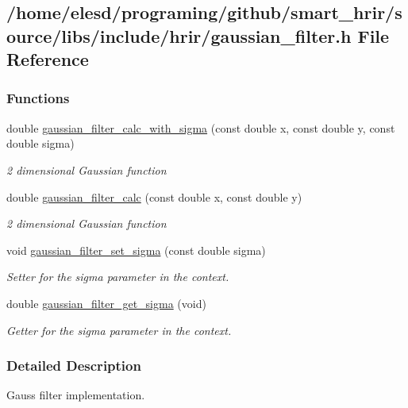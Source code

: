 \hypertarget{a00008}{\subsection{/home/elesd/programing/github/smart\-\_\-hrir/source/libs/include/hrir/gaussian\-\_\-filter.h File Reference}
\label{a00008}
}
\subsubsection*{Functions}
\begin{DoxyCompactItemize}
\item 
double \hyperlink{a00008_a316f61d728c11dcb3990199530349adb}{gaussian\-\_\-filter\-\_\-calc\-\_\-with\-\_\-sigma} (const double x, const double y, const double sigma)
\begin{DoxyCompactList}\small\item\em 2 dimensional Gaussian function \end{DoxyCompactList}\item 
double \hyperlink{a00008_ada1fef0f18b43799dcc82232bf786ad5}{gaussian\-\_\-filter\-\_\-calc} (const double x, const double y)
\begin{DoxyCompactList}\small\item\em 2 dimensional Gaussian function \end{DoxyCompactList}\item 
void \hyperlink{a00008_ac5f9dcbf038d161db3a68a80657990e4}{gaussian\-\_\-filter\-\_\-set\-\_\-sigma} (const double sigma)
\begin{DoxyCompactList}\small\item\em Setter for the sigma parameter in the context. \end{DoxyCompactList}\item 
double \hyperlink{a00008_aae1cf8b3c6e0bd2b8c4f9ade61501421}{gaussian\-\_\-filter\-\_\-get\-\_\-sigma} (void)
\begin{DoxyCompactList}\small\item\em Getter for the sigma parameter in the context. \end{DoxyCompactList}\end{DoxyCompactItemize}


\subsubsection{Detailed Description}
Gauss filter implementation. 

